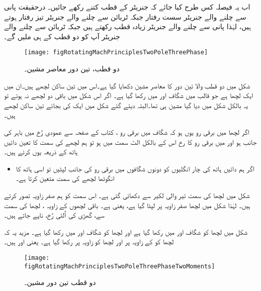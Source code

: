  اب یہ فیصلہ کس طرح کیا جائے کہ جنریٹر کے قطب کتنے رکھے جائیں۔ درحقیقت پانی سے چلنے والے جنریٹر سست رفتار جبکہ ٹربائن سے چلنے والے جنریٹر تیز رفتار ہوتے ہیں، لہٰذا پانی سے چلنے والے جنریٹر زیادہ قطب رکھتے ہیں جبکہ ٹربائن سے چلنے والے جنریٹر آپ کو دو قطب کے ہی ملیں گے۔
\begin{figure}
\centering
\texttt{[image: figRotatingMachPrinciplesTwoPoleThreePhase]}
\caption{دو قطب، تین دور معاصر مشین۔}
\label{شکل_گھومتے_مشین_دو_قطب_تین_دور_معاصر}
\end{figure}

شکل   میں دو قطب والا تین دور کا معاصر مشین دکھایا گیا ہے۔اس میں تین ساکن لچھے ہیں۔ان میں ایک لچھا  ہے جو قالب میں  شگاف   اور  میں رکھا گیا ہے۔ اگر اس شکل میں باقی دو لچھے نہ ہوتے تو یہ بالکل شکل   میں دیا گیا مشین ہی تھا۔البتہ دیئے گئے شکل میں ایک کی بجائے تین ساکن لچھے ہیں۔

 اگر  لچھا  میں برقی رو یوں ہو کہ شگاف  میں برقی رو ، کتاب کے صفحہ سے عمودی رُخ میں باہر کی جانب ہو اور   میں برقی رو کا رخ اس کے بالکل الٹ سمت میں ہو تو ہم لچھے کی سمت کا تعین دائیں ہاتھ کے ذریعہ یوں کرتے ہیں۔

\begin{itemize}
\item
اگر ہم دائیں ہاتھ کی چار انگلیوں کو دونوں شگافوں میں برقی رو کی جانب لپٹیں تو اسی ہاتھ کا انگوٹھا لچھے کی سمت متعین کرتا ہے۔
\end{itemize}

 شکل   میں لچھا  کی سمت تیر والی لکیر سے دکھائی گئی ہے۔ اس سمت کو ہم صفر زاویہ تصور کرتے ہیں۔ لہٰذا شکل میں  لچھا صفر زاویہ پر لپٹا گیا ہے، یعنی  ہے۔ باقی لچھوں کے زاویہ ، لچھا  کی سمت سے، گھڑی کی اُلٹی رُخ، ناپے جاتے ہیں۔

شکل   میں لچھا  کو شگاف  اور  میں رکھا گیا ہے اور لچھا  کو شگاف  اور  میں رکھا گیا ہے۔ مزید یہ کہ لچھا  کو  کے زاویہ پر اور لچھا  کو  زاویہ پر رکھا گیا ہے۔ یعنی  اور  ہیں۔
\begin{figure}
\centering
\texttt{[image: figRotatingMachPrinciplesTwoPoleThreePhaseTwoMoments]}
\caption{دو قطب تین دور مشین۔}
\label{شکل_گھومتے_مشین_دو_قطب_تین_دور_مختلف_لمحات}
\end{figure}

